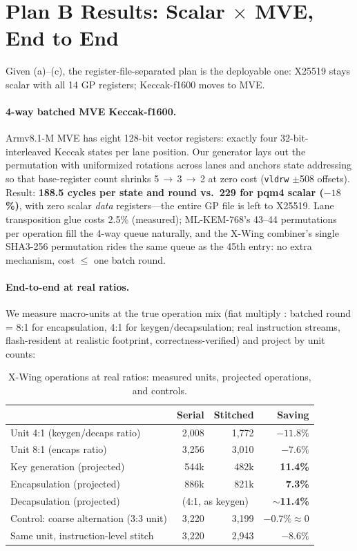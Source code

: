 \documentclass[11pt,a4paper]{article}
\newcommand{\xwing}{X-Wing}\newcommand{\slothy}{SLOTHY}\newcommand{\keccak}{Keccak-f1600}
\begin{document}
\section{Plan B Results: Scalar $\times$ MVE, End to End}\label{sec:planb}

Given (a)--(c), the register-file-separated plan is the deployable one: X25519
stays scalar with all 14 GP registers; \keccak{} moves to MVE.

\paragraph{4-way batched MVE \keccak{}.} Armv8.1-M MVE has eight 128-bit
vector registers: exactly four 32-bit-interleaved Keccak states per lane
position. Our generator lays out the permutation with uniformized rotations
across lanes and anchors state addressing so that base-register count shrinks
5$\,\to\,$3$\,\to\,$2 at zero cost (\texttt{vldrw} $\pm$508 offsets). Result:
\textbf{188.5 cycles per state and round vs.\ 229 for pqm4 scalar ($-18$\%)}, with zero
scalar \emph{data} registers---the entire GP file is left to X25519. Lane
transposition glue costs 2.5\% (measured); ML-KEM-768's 43--44 permutations per
operation fill the 4-way queue naturally, and the \xwing{} combiner's single
SHA3-256 permutation rides the same queue as the 45th entry: no extra
mechanism, cost $\leq$ one batch round.

\paragraph{End-to-end at real ratios.} We measure macro-units at the true
operation mix (fiat multiply : batched round = 8:1 for encapsulation, 4:1 for
keygen/decapsulation; real instruction streams, flash-resident at realistic
footprint, correctness-verified) and project by unit counts:

\begin{table}[t]\centering
\caption{\xwing{} operations at real ratios: measured units, projected
operations, and controls.}
\label{tab:final}
\begin{tabular}{lrrr}\toprule
& Serial & Stitched & Saving\\\midrule
Unit 4:1 (keygen/decaps ratio) & 2,008 & 1,772 & $-11.8\%$\\
Unit 8:1 (encaps ratio) & 3,256 & 3,010 & $-7.6\%$\\\midrule
Key generation (projected) & 544k & 482k & \textbf{11.4\%}\\
Encapsulation (projected) & 886k & 821k & \textbf{7.3\%}\\
Decapsulation (projected) & \multicolumn{2}{c}{(4:1, as keygen)} & \textbf{$\sim$11.4\%}\\\midrule
Control: coarse alternation (3:3 unit) & 3,220 & 3,199 & $-0.7\% \approx 0$\\
Same unit, instruction-level stitch & 3,220 & 2,943 & $-8.6\%$\\\bottomrule
\end{tabular}\end{table}
\end{document}
